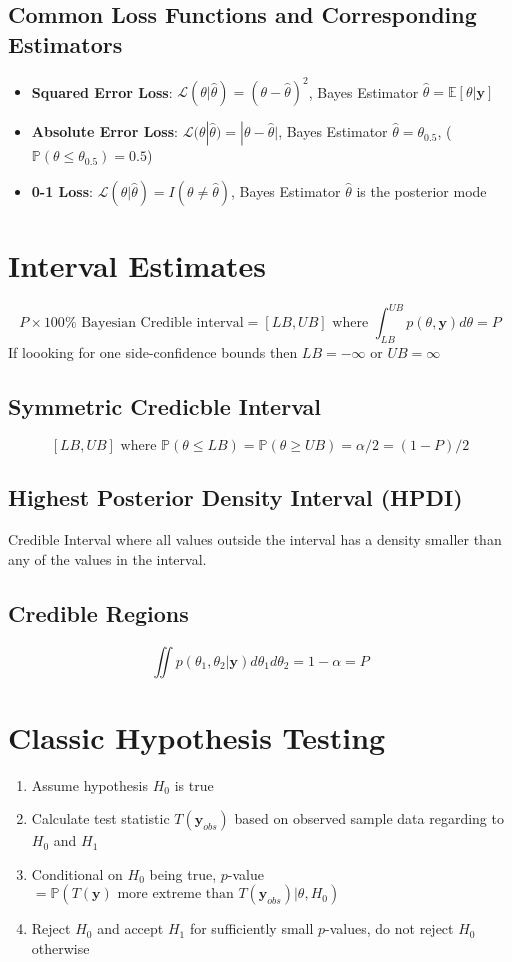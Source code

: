 \documentclass[12pt]{article}
\theoremstyle{definition}
\newcommand{\Prob}[1]{\mathbb{P}(#1)}
\newcommand{\Expect}[1]{\mathbb{E}\left[#1\right]}
\begin{document}
	\subsection*{Common Loss Functions and Corresponding Estimators}
	 \begin{itemize}
		 \item \textbf{Squared Error Loss}: $\mathcal{L}(\theta|\hat{\theta}) = (\theta - \hat{\theta})^2$, Bayes Estimator $\hat{\theta} = \Expect{\theta|\bm{y}}$
		 \item \textbf{Absolute Error Loss}: $\mathcal{L}(\theta|\hat{\theta}) = |\theta - \hat{\theta}|$, Bayes Estimator $\hat{\theta} = \theta_{0.5}$, ($\Prob{\theta \leq \theta_{0.5}} = 0.5$)
		 \item \textbf{0-1 Loss}: $\mathcal{L}(\theta|\hat{\theta}) = I(\theta \neq \hat{\theta})$, Bayes Estimator $\hat{\theta}$ is the posterior mode
	 \end{itemize}

\newpage
\section{Interval Estimates}
	$$P\times 100\% \text{ Bayesian Credible interval} =[LB, UB] \text{ where } \int_{LB}^{UB} p(\theta,\bm{y})d\theta = P$$
	If loooking for one side-confidence bounds then $LB = -\infty$ or $UB = \infty$
	\subsection*{Symmetric Credicble Interval}
		$$[LB,UB] \text{ where } \Prob{\theta \leq LB} = \Prob{\theta \geq UB} = \alpha/2 = (1-P)/2$$
	\subsection*{Highest Posterior Density Interval (HPDI)}
		Credible Interval where all values outside the interval has a density smaller than any of the values in the interval.
	\subsection*{Credible Regions}
        $$\iint p(\theta_1, \theta_2| \bm{y})d\theta_1 d\theta_2 = 1 - \alpha = P$$ 

\section{Classic Hypothesis Testing}
    \begin{enumerate}
        \item Assume hypothesis $H_0$ is true
        \item Calculate test statistic $T(\bm{y}_{obs})$ based on observed sample data regarding to $H_0$ and $H_1$
        \item Conditional on $H_0$ being true, $p$-value $= \Prob{T(\bm{y})\text{ more extreme than } T(\bm{y}_{obs})|\theta, H_0}$
        \item Reject $H_0$ and accept $H_1$ for sufficiently small $p$-values, do not reject $H_0$ otherwise
    \end{enumerate}
\end{document}
